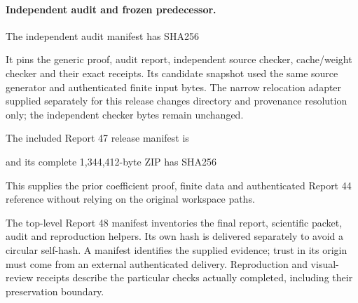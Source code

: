 \paragraph{Independent audit and frozen predecessor.}
The independent audit manifest has SHA256
\par{\small\noindent{}\par}
It pins the generic proof, audit report, independent source checker, cache/weight checker and their exact receipts. Its candidate snapshot used the same source generator and authenticated finite input bytes. The narrow relocation adapter supplied separately for this release changes directory and provenance resolution only; the independent checker bytes remain unchanged.

The included Report 47 release manifest is
\par{\small\noindent{}\par}
and its complete 1,344,412-byte ZIP has SHA256
\par{\small\noindent{}\par}
This supplies the prior coefficient proof, finite data and authenticated Report 44 reference without relying on the original workspace paths.

The top-level Report 48 manifest inventories the final report, scientific packet, audit and reproduction helpers. Its own hash is delivered separately to avoid a circular self-hash. A manifest identifies the supplied evidence; trust in its origin must come from an external authenticated delivery. Reproduction and visual-review receipts describe the particular checks actually completed, including their preservation boundary.
